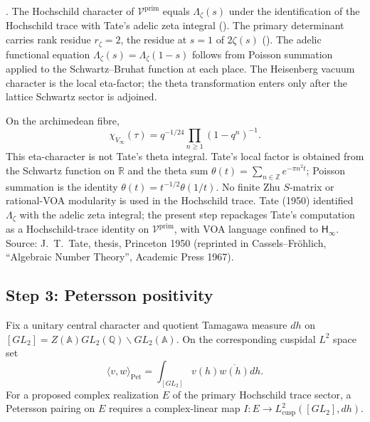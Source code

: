 \begin{theorem}
\label{v4-arith:w5-direct:thm:P2-elementary}
\ClaimStatusProvedHere. The Hochschild character of
\(\mathcal{V}^{\mathrm{prim}}\) equals \(\Lambda_{\zeta}(s)\) under the
identification of the Hochschild trace with Tate's adelic zeta integral
(). The primary
determinant carries rank residue \(r_{\zeta}=2\), the residue at
\(s=1\) of \(2\zeta(s)\) (). The adelic
functional equation \(\Lambda_{\zeta}(s)=\Lambda_{\zeta}(1-s)\) follows
from Poisson summation applied to the Schwartz--Bruhat function at each
place.  The Heisenberg vacuum character is the local eta-factor; the
theta transformation enters only after the lattice Schwartz sector is
adjoined.
\end{theorem}

\begin{remark}
\label{v4-arith:w5-direct:rem:P2-elementary}
On the archimedean fibre,
\[
\chi_{V_{\infty}}(\tau)=q^{-1/24}\prod_{n\geq1}(1-q^{n})^{-1}.
\]
This eta-character is not Tate's theta integral.  Tate's local factor is
obtained from the Schwartz function on \(\mathbb{R}\) and the theta sum
\(\theta(t)=\sum_{n\in\mathbb{Z}}e^{-\pi n^{2}t}\); Poisson summation is
the identity \(\theta(t)=t^{-1/2}\theta(1/t)\).  No finite Zhu
\(S\)-matrix or rational-VOA modularity is used in the Hochschild trace.
Tate (1950) identified \(\Lambda_{\zeta}\) with the adelic zeta integral;
the present step repackages Tate's computation as a Hochschild-trace
identity on \(\mathcal{V}^{\mathrm{prim}}\), with VOA language confined
to \(\mathsf{H}_{\infty}\). Source: J.~T.~Tate, thesis, Princeton 1950
(reprinted in Cassels--Fr\"{o}hlich, ``Algebraic Number Theory'',
Academic Press 1967).
\end{remark}

\subsection{Step 3: Petersson positivity}
\label{v4-arith:w5-direct:step-3}


\begin{definition}
\label{v4-arith:w5-direct:def:petersson}
Fix a unitary central character and quotient Tamagawa measure $dh$ on
$[GL_2]=Z(\mathbb A)GL_2(\mathbb Q)\backslash GL_2(\mathbb A)$.
On the corresponding cuspidal $L^2$ space set
\begin{equation}
\label{v4-arith:w5-direct:eq:petersson}
 \langle v,w\rangle_{\mathrm{Pet}}=
 \int_{[GL_2]}v(h)\overline{w(h)}dh.
\end{equation}
For a proposed complex realization $E$ of the primary Hochschild
trace sector, a Petersson pairing on $E$ requires a complex-linear map
$I:E\to L^2_{\mathrm{cusp}}([GL_2],dh)$.
\end{definition}


